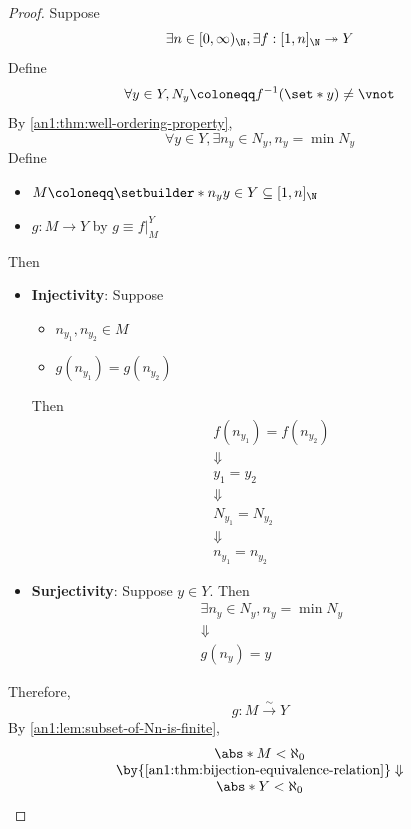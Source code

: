 \begin{proof}
  Suppose
  \[
    \exists n \in [0, \infty)_{\N}, \exists f: [1, n]_{\N} \twoheadrightarrow Y
  \]
  Define
  \[
    \forall y \in Y, N_{y} \coloneqq f^{-1}(\set*{y}) \neq \vnot
  \]
  By \cref{an1:thm:well-ordering-property},
  \[
    \forall y \in Y, \exists n_{y} \in N_{y}, n_{y} = \min N_{y}
  \]
  Define
  \begin{itemize}
    \item $M \coloneqq \setbuilder*{n_{y}}{y \in Y} \subseteq [1, n]_{\N}$
    \item $g: M \to Y$ by $g \equiv f|_{M}^{Y}$
  \end{itemize}
  Then
  \begin{itemize}
    \item \textbf{Injectivity}: Suppose
          \begin{itemize}
            \item $n_{y_{1}}, n_{y_{2}} \in M$
            \item $g(n_{y_{1}}) = g(n_{y_{2}})$
          \end{itemize}
          Then
          \[
            \begin{array}{c}
              f(n_{y_{1}}) = f(n_{y_{2}}) \\
              \Downarrow                  \\
              y_{1} = y_{2}               \\
              \Downarrow                  \\
              N_{y_{1}} = N_{y_{2}}       \\
              \Downarrow                  \\
              n_{y_{1}} = n_{y_{2}}
            \end{array}
          \]
    \item \textbf{Surjectivity}: Suppose $y \in Y$. Then
          \[
            \begin{array}{c}
              \exists n_{y} \in N_{y}, n_{y} = \min N_{y} \\
              \Downarrow                                  \\
              g(n_{y}) = y
            \end{array}
          \]
  \end{itemize}
  Therefore,
  \[
    g: M \xrightarrow{\sim} Y
  \]
  By \cref{an1:lem:subset-of-Nn-is-finite},
  \[
    \begin{array}{c}
      \abs*{M} < \aleph_{0}                                         \\
      \by{\Cref{an1:thm:bijection-equivalence-relation}} \Downarrow \\
      \abs*{Y} < \aleph_{0}
    \end{array}
  \]
\end{proof}

